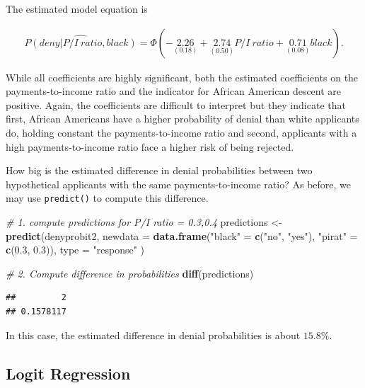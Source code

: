 \documentclass[]{book}
\newenvironment{Shaded}{\begin{snugshade}}{\end{snugshade}}
\newcommand{\KeywordTok}[1]{\textcolor[rgb]{0.13,0.29,0.53}{\textbf{#1}}}
\newcommand{\DataTypeTok}[1]{\textcolor[rgb]{0.13,0.29,0.53}{#1}}
\newcommand{\FloatTok}[1]{\textcolor[rgb]{0.00,0.00,0.81}{#1}}
\newcommand{\StringTok}[1]{\textcolor[rgb]{0.31,0.60,0.02}{#1}}
\newcommand{\CommentTok}[1]{\textcolor[rgb]{0.56,0.35,0.01}{\textit{#1}}}
\newcommand{\NormalTok}[1]{#1}
\theoremstyle{definition}
\theoremstyle{definition}
\theoremstyle{definition}
\theoremstyle{remark}
\begin{document}
The estimated model equation is

\begin{align}
  \widehat{P(deny\vert P/I \ ratio, black)} = \Phi (-\underset{(0.18)}{2.26} + \underset{(0.50)}{2.74} P/I \ ratio + \underset{(0.08)}{0.71} black). \label{eq:denyprobit2} 
\end{align}

While all coefficients are highly significant, both the estimated
coefficients on the payments-to-income ratio and the indicator for
African American descent are positive. Again, the coefficients are
difficult to interpret but they indicate that first, African Americans
have a higher probability of denial than white applicants do, holding
constant the payments-to-income ratio and second, applicants with a high
payments-to-income ratio face a higher risk of being rejected.

How big is the estimated difference in denial probabilities between two
hypothetical applicants with the same payments-to-income ratio? As
before, we may use \texttt{predict()} to compute this difference.

\begin{Shaded}
\begin{Highlighting}[]
\CommentTok{# 1. compute predictions for P/I ratio = 0.3,0.4}
\NormalTok{predictions <-}\StringTok{ }\KeywordTok{predict}\NormalTok{(denyprobit2, }
                       \DataTypeTok{newdata =} \KeywordTok{data.frame}\NormalTok{(}\StringTok{"black"}\NormalTok{ =}\StringTok{ }\KeywordTok{c}\NormalTok{(}\StringTok{"no"}\NormalTok{, }\StringTok{"yes"}\NormalTok{), }
                                            \StringTok{"pirat"}\NormalTok{ =}\StringTok{ }\KeywordTok{c}\NormalTok{(}\FloatTok{0.3}\NormalTok{, }\FloatTok{0.3}\NormalTok{)),}
                       \DataTypeTok{type =} \StringTok{"response"}
\NormalTok{                       )}

\CommentTok{# 2. Compute difference in probabilities}
\KeywordTok{diff}\NormalTok{(predictions)}
\end{Highlighting}
\end{Shaded}

\begin{verbatim}
##         2 
## 0.1578117
\end{verbatim}

In this case, the estimated difference in denial probabilities is about
\(15.8\%\).

\subsection*{Logit Regression}\label{logit-regression}
\end{document}
